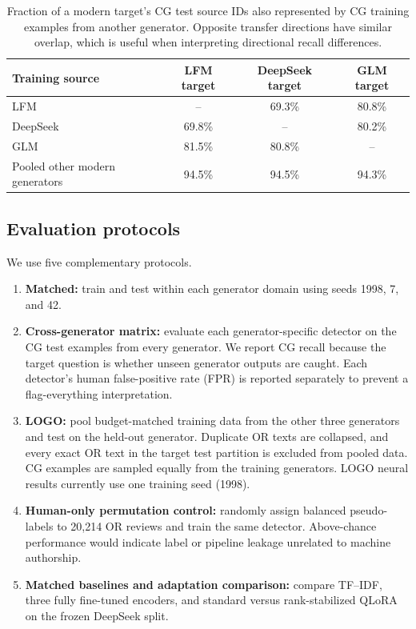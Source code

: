 \documentclass[utf8]{FrontiersinHarvard}
\begin{document}
\begin{table}[h!]
\centering
\caption{Fraction of a modern target's CG test source IDs also represented by CG training examples from another generator. Opposite transfer directions have similar overlap, which is useful when interpreting directional recall differences.}
\label{tab:overlap}
\begin{tabular}{lccc}
\toprule
Training source & LFM target & DeepSeek target & GLM target \\
\midrule
LFM & -- & 69.3\% & 80.8\% \\
DeepSeek & 69.8\% & -- & 80.2\% \\
GLM & 81.5\% & 80.8\% & -- \\
Pooled other modern generators & 94.5\% & 94.5\% & 94.3\% \\
\bottomrule
\end{tabular}
\end{table}

\subsection{Evaluation protocols}

We use five complementary protocols.

\begin{enumerate}
\item \textbf{Matched:} train and test within each generator domain using seeds 1998, 7, and 42.
\item \textbf{Cross-generator matrix:} evaluate each generator-specific detector on the CG test examples from every generator. We report CG recall because the target question is whether unseen generator outputs are caught. Each detector's human false-positive rate (FPR) is reported separately to prevent a flag-everything interpretation.
\item \textbf{LOGO:} pool budget-matched training data from the other three generators and test on the held-out generator. Duplicate OR texts are collapsed, and every exact OR text in the target test partition is excluded from pooled data. CG examples are sampled equally from the training generators. LOGO neural results currently use one training seed (1998).
\item \textbf{Human-only permutation control:} randomly assign balanced pseudo-labels to 20,214 OR reviews and train the same detector. Above-chance performance would indicate label or pipeline leakage unrelated to machine authorship.
\item \textbf{Matched baselines and adaptation comparison:} compare TF--IDF, three fully fine-tuned encoders, and standard versus rank-stabilized QLoRA on the frozen DeepSeek split.
\end{enumerate}
\end{document}
